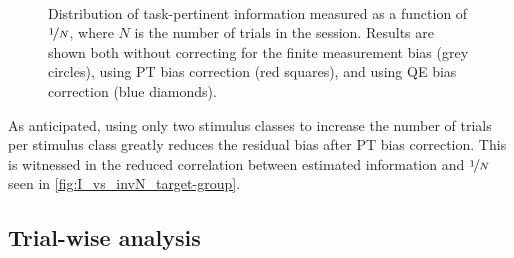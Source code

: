 \begin{figure}[htbp]
    \centering
    \hspace*{\fill}
    \hspace*{\fill}\hspace{.2cm}\hspace*{\fill}
    \hspace*{\fill}
    \\
    \hspace*{\fill}
    \hspace*{\fill}\hspace{.2cm}\hspace*{\fill}
    \hspace*{\fill}
    \caption{Distribution of task-pertinent information measured as a function of $\nicefrac{1}{N}$, where $N$ is the number of trials in the session.
Results are shown both without correcting for the finite measurement bias (grey circles), using \ac{PT} bias correction (red squares), and using \ac{QE} bias correction (blue diamonds).
}
    \label{fig:I_vs_invN_target-group}
\end{figure}


As anticipated, using only two stimulus classes to increase the number of trials per stimulus class greatly reduces the residual bias after \ac{PT} bias correction.
This is witnessed in the reduced correlation between estimated information and $\nicefrac{1}{N}$ seen in \autoref{fig:I_vs_invN_target-group}.

\subsection{Trial-wise analysis}

